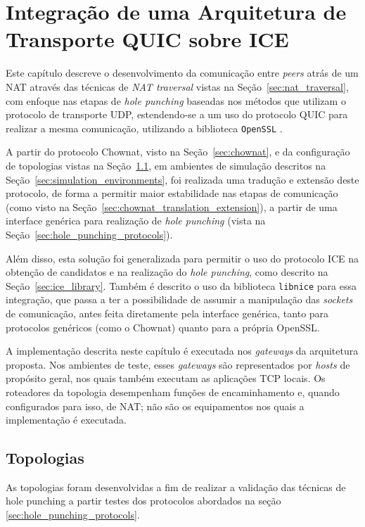 \chapter{Integração de uma Arquitetura de Transporte QUIC sobre ICE}
\label{chap:implementation}

Este capítulo descreve o desenvolvimento da comunicação entre \textit{peers} atrás de um NAT através das técnicas de \textit{NAT traversal} vistas na Seção~\ref{sec:nat_traversal}, com enfoque nas etapas de \textit{hole punching} baseadas nos métodos que utilizam o protocolo de transporte UDP, estendendo-se a um uso do protocolo QUIC para realizar a mesma comunicação, utilizando a biblioteca \texttt{OpenSSL} \citep{openssl_quic}.

A partir do protocolo Chownat, visto na Seção~\ref{sec:chownat}, e da configuração de topologias vistas na Seção~\ref{sec:topologies}, em ambientes de simulação descritos na Seção~\ref{sec:simulation_environments}, foi realizada uma tradução e extensão deste protocolo, de forma a permitir maior estabilidade nas etapas de comunicação (como visto na Seção~\ref{sec:chownat_translation_extension}), a partir de uma interface genérica para realização de \textit{hole punching} (vista na Seção~\ref{sec:hole_punching_protocols}).

Além disso, esta solução foi generalizada para permitir o uso do protocolo ICE na obtenção de candidatos e na realização do \textit{hole punching}, como descrito na Seção~\ref{sec:ice_library}. Também é descrito o uso da biblioteca \texttt{libnice} para essa integração, que passa a ter a possibilidade de assumir a manipulação das \textit{sockets} de comunicação, antes feita diretamente pela interface genérica, tanto para protocolos genéricos (como o Chownat) quanto para a própria OpenSSL.

A implementação descrita neste capítulo é executada nos \textit{gateways} da arquitetura proposta. Nos ambientes de teste, esses \textit{gateways} são representados por \textit{hosts} de propósito geral, nos quais também executam as aplicações TCP locais. Os roteadores da topologia desempenham funções de encaminhamento e, quando configurados para isso, de NAT; não são os equipamentos nos quais a implementação é executada.

\section{Topologias}
\label{sec:topologies}

As topologias foram desenvolvidas a fim de realizar a validação das técnicas de hole punching a partir testes dos protocolos abordados na seção \ref{sec:hole_punching_protocols}. 

